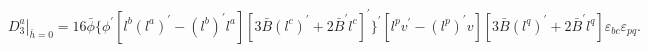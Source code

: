 \begin{equation*}
\left. D_{3}^{a}\right| _{\bar{h}=0}=16\bar{\phi}\{\phi ^{\prime
}[l^{b}(l^{a})^{\prime }-(l^{b})^{\prime }l^{a}][3\bar{B}(l^{c})^{\prime }+2%
\bar{B}^{\prime }l^{c}]^{\prime }\}^{\prime }[l^{p}v^{\prime
}-(l^{p})^{\prime }v][3\bar{B}(l^{q})^{\prime }+2\bar{B}^{\prime
}l^{q}]\varepsilon _{bc}\varepsilon _{pq}.
\end{equation*}

